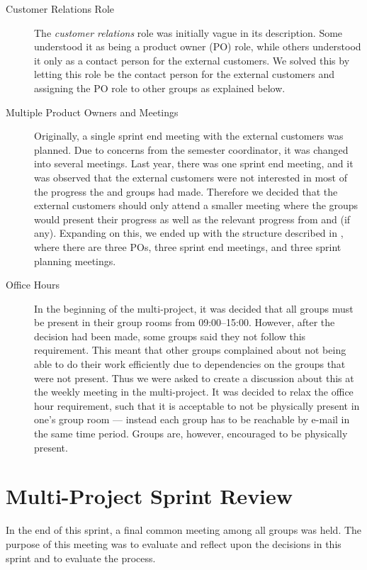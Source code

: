 \begin{description}
  \item[Customer Relations Role] The \emph{customer relations} role was initially vague in its description. Some understood it as being a product owner (PO) role, while others understood it only as a contact person for the external customers. We solved this by letting this role be the contact person for the external customers and assigning the PO role to other groups as explained below.
  \item[Multiple Product Owners and Meetings] Originally, a single sprint end meeting with the external customers was planned. Due to concerns from the semester coordinator, it was changed into several meetings. Last year, there was one sprint end meeting, and it was observed that the external customers were not interested in most of the progress the \db and \bd groups had made. Therefore we decided that the external customers should only attend a smaller meeting where the \gui groups would present their progress as well as the relevant progress from \db and \bd (if any). Expanding on this, we ended up with the structure described in , where there are three POs, three sprint end meetings, and three sprint planning meetings.
  \item[Office Hours] In the beginning of the multi-project, it was decided that all groups must be present in their group rooms from 09:00--15:00. However, after the decision had been made, some groups said they not follow this requirement. This meant that other groups complained about not being able to do their work efficiently due to dependencies on the groups that were not present. Thus we were asked to create a discussion about this at the weekly meeting in the multi-project. It was decided to relax the office hour requirement, such that it is acceptable to not be physically present in one's group room --- instead each group has to be reachable by e-mail in the same time period. Groups are, however, encouraged to be physically present.
\end{description}

\section{Multi-Project Sprint Review}
In the end of this sprint, a final common meeting among all groups was held. The purpose of this meeting was to evaluate and reflect upon the decisions in this sprint and to evaluate the process.

